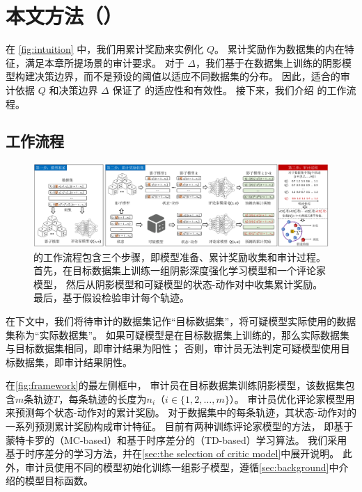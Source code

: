 \section{本文方法（\sysnameo）}
在 \autoref{fig:intuition} 中，我们用累计奖励来实例化 $Q$。
累计奖励作为数据集的内在特征，满足本章所提场景的审计要求。
对于 $\Delta$，我们基于在数据集上训练的阴影模型构建决策边界，而不是预设的阈值以适应不同数据集的分布。
因此，适合的审计依据 $Q$ 和决策边界 $\Delta$ 保证了 \sysnameo 的适应性和有效性。
接下来，我们介绍 \sysnameo 的工作流程。

\subsection{工作流程}
\label{sec:workflow}
\begin{figure}[!ht]
    \includegraphics[width=\hsize]{figure/orl_auditor/framework-v8ch.pdf}
    \caption{
    \sysnameo 的工作流程包含三个步骤，即模型准备、累计奖励收集和审计过程。
    首先，\sysnameo 在目标数据集上训练一组阴影深度强化学习模型和一个评论家模型，
    然后从阴影模型和可疑模型的状态-动作对中收集累计奖励。最后，\sysnameo 基于假设检验审计每个轨迹。
    }
    \label{fig:framework}
\end{figure}
在下文中，我们将待审计的数据集记作“目标数据集”，将可疑模型实际使用的数据集称为“实际数据集”。
如果可疑模型是在目标数据集上训练的，那么实际数据集与目标数据集相同，即审计结果为阳性；
否则，审计员无法判定可疑模型使用目标数据集，即审计结果阴性。

在\autoref{fig:framework}的最左侧框中，
审计员在目标数据集训练阴影模型，该数据集包含$m$条轨迹$T$，每条轨迹的长度为$n_i$（$i \in \{1,2,\dots, m\}$）。
审计员优化评论家模型用来预测每个状态-动作对的累计奖励。
对于数据集中的每条轨迹，其状态-动作对的一系列预测累计奖励构成审计特征。
目前有两种训练评论家模型的方法，
即基于蒙特卡罗的（MC-based）和基于时序差分的（TD-based）学习算法。
我们采用基于时序差分的学习方法，并在\autoref{sec:the selection of critic model}中展开说明。
此外，审计员使用不同的模型初始化训练一组影子模型，遵循\autoref{sec:background}中介绍的模型目标函数。


